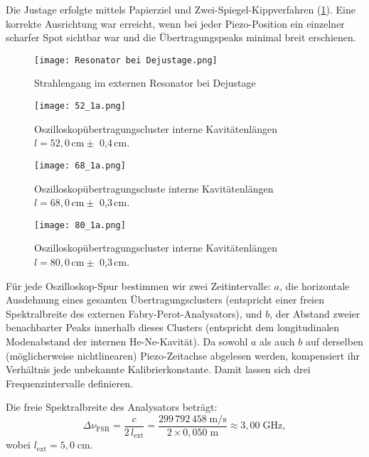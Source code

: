 Die Justage erfolgte mittels Papierziel und Zwei-Spiegel-Kippverfahren (\cref{fig:Resonator}). 
Eine korrekte Ausrichtung war erreicht, wenn bei jeder Piezo-Position ein einzelner scharfer Spot sichtbar war und die Übertragungspeaks minimal breit erschienen.
\begin{figure}[htbp]
  \centering
  \texttt{[image: Resonator bei Dejustage.png]}
  \caption{Strahlengang im externen Resonator bei Dejustage \cite{praktikum}}
  \label{fig:Resonator}
\end{figure}
\begin{figure}[htbp]
    \centering
    \texttt{[image: 52\_1a.png]}
     \caption{Oszilloskopübertragungscluster interne Kavitätenlängen $l = 52,0\,\si{\centi\meter} \pm$ 0{,}4\,\si{\centi\meter}.}
    \label{fig:9a}
\end{figure}
  \begin{figure}[htbp]
    \centering
    \texttt{[image: 68\_1a.png]}
     \caption{Oszilloskopübertragungscluste interne Kavitätenlängen $l = 68,0\,\si{\centi\meter} \pm$ 0{,}3\,\si{\centi\meter}.}
    \label{fig:9b}
  \end{figure}
  \newpage
  \begin{figure}[htbp]
    \centering
    \texttt{[image: 80\_1a.png]}
     \caption{Oszilloskopübertragungscluster interne Kavitätenlängen $l = 80,0\,\si{\centi\meter} \pm$ 0{,}3\,\si{\centi\meter}.}
    \label{fig:9c}
  \end{figure}
 
 Für jede Oszilloskop-Spur bestimmen wir zwei Zeitintervalle: $a$, die horizontale Ausdehnung eines gesamten Übertragungsclusters (entspricht einer freien Spektralbreite des externen Fabry-Perot-Analysators), und $b$, der Abstand zweier benachbarter Peaks innerhalb dieses Clusters (entspricht dem longitudinalen Modenabstand der internen He-Ne-Kavität). 
 Da sowohl $a$ als auch $b$ auf derselben (möglicherweise nichtlinearen) Piezo-Zeitachse abgelesen werden, kompensiert ihr Verhältnis jede unbekannte Kalibrierkonstante. Damit lassen sich drei Frequenzintervalle definieren.

 Die freie Spektralbreite des Analysators beträgt:
\begin{equation}
  \Delta\nu_{\mathrm{FSR}}
  = \frac{c}{2\,l_{\mathrm{ext}}}
  = \frac{299\,792\,458\;\mathrm{m/s}}{2 \times 0{,}050\;\mathrm{m}}
  \approx 3{,}00\;\mathrm{GHz},
\end{equation}
wobei $l_{\mathrm{ext}} = 5{,}0\;\mathrm{cm}$.

